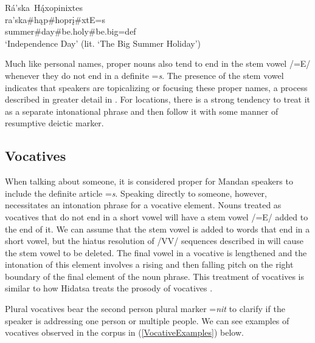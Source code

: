 \begin{exe}
\begin{xlist}
    \item \glll Rá'ska~Hą́xopinixtes\\
    ra'ska\#hąp\#hoprį\#xtE=s\\
    \textnormal{summer}\#\textnormal{day}\#\textnormal{be.holy}\#\textnormal{be.big}=def\\
    \glt `Independence Day' (lit. `The Big Summer Holiday') \citep[169]{hollow1970}
    
    \end{xlist}
 
\end{exe}

Much like personal names, proper nouns also tend to end in the stem vowel /=E/ whenever they do not end in a definite =\textit{s}. The presence of the stem vowel indicates that speakers are topicalizing or focusing these proper names, a process described in greater detail in . For locations, there is a strong tendency to treat it as a separate intonational phrase and then follow it with some manner of resumptive deictic marker.


 
\subsection{Vocatives}\label{SubSecVocatives}

When talking about someone, it is considered proper for Mandan speakers to include the definite article =\textit{s}. Speaking directly to someone, however, necessitates an intonation phrase for a vocative element. Nouns treated as vocatives that do not end in a short vowel will have a stem vowel /=E/ added to the end of it. We can assume that the stem vowel is added to words that end in a short vowel, but the hiatus resolution of /VV/ sequences described in  will cause the stem vowel to be deleted. The final vowel in a vocative is lengthened and the intonation of this element involves a rising and then falling pitch on the right boundary of the final element of the noun phrase. This treatment of vocatives is similar to how Hidatsa treats the prosody of vocatives \citep[461]{park2012}.

Plural vocatives bear the second person plural marker =\textit{nit} to clarify if the speaker is addressing one person or multiple people. We can see examples of vocatives observed in the corpus in (\ref{VocativeExamples}) below.

\newpage

